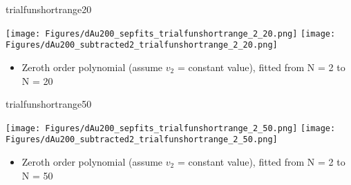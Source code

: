 \documentclass[aspectratio=169,compress,10pt]{beamer}
\begin{document}
\begin{frame}{trialfunshortrange20}
\begin{center}
\texttt{[image: Figures/dAu200\_sepfits\_trialfunshortrange\_2\_20.png]}
\texttt{[image: Figures/dAu200\_subtracted2\_trialfunshortrange\_2\_20.png]}
\end{center}
\begin{itemize}
\item Zeroth order polynomial (assume $v_2$ = constant value), fitted from N = 2 to N = 20
\end{itemize}
\end{frame}



\begin{frame}{trialfunshortrange50}
\begin{center}
\texttt{[image: Figures/dAu200\_sepfits\_trialfunshortrange\_2\_50.png]}
\texttt{[image: Figures/dAu200\_subtracted2\_trialfunshortrange\_2\_50.png]}
\end{center}
\begin{itemize}
\item Zeroth order polynomial (assume $v_2$ = constant value), fitted from N = 2 to N = 50
\end{itemize}
\end{frame}
\end{document}
